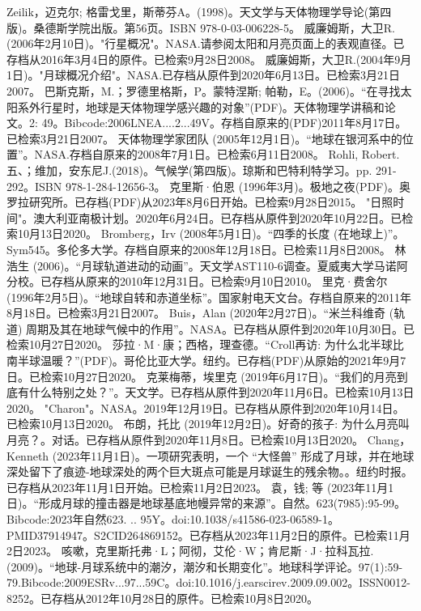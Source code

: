 \begin{enumerate}
 Zeilik，迈克尔; 格雷戈里，斯蒂芬A。(1998)。天文学与天体物理学导论(第四版)。桑德斯学院出版。第56页。ISBN 978-0-03-006228-5。
 威廉姆斯，大卫R.(2006年2月10日)。"行星概况"。NASA.请参阅太阳和月亮页面上的表观直径。已存档从2016年3月4日的原件。已检索9月28日2008。
 威廉姆斯，大卫R.(2004年9月1日)。"月球概况介绍"。NASA.已存档从原件到2020年6月13日。已检索3月21日2007。
 巴斯克斯，M.；罗德里格斯，P。蒙特涅斯; 帕勒，E。(2006)。“在寻找太阳系外行星时，地球是天体物理学感兴趣的对象”(PDF)。天体物理学讲稿和论文。2: 49。Bibcode:2006LNEA....2...49V。存档自原来的(PDF)2011年8月17日。已检索3月21日2007。
 天体物理学家团队 (2005年12月1日)。“地球在银河系中的位置”。NASA.存档自原来的2008年7月1日。已检索6月11日2008。
 Rohli, Robert.五、；维加，安东尼J.(2018)。气候学(第四版)。琼斯和巴特利特学习。pp. 291-292。ISBN 978-1-284-12656-3。
 克里斯·伯恩 (1996年3月)。极地之夜(PDF)。奥罗拉研究所。已存档(PDF)从2023年8月6日开始。已检索9月28日2015。
 "日照时间"。澳大利亚南极计划。2020年6月24日。已存档从原件到2020年10月22日。已检索10月13日2020。
 Bromberg，Irv (2008年5月1日)。“四季的长度 (在地球上)”。Sym545。多伦多大学。存档自原来的2008年12月18日。已检索11月8日2008。
 林浩生 (2006)。“月球轨道进动的动画”。天文学AST110-6调查。夏威夷大学马诺阿分校。已存档从原来的2010年12月31日。已检索9月10日2010。
 里克·费舍尔 (1996年2月5日)。“地球自转和赤道坐标”。国家射电天文台。存档自原来的2011年8月18日。已检索3月21日2007。
 Buis，Alan (2020年2月27日)。“米兰科维奇 (轨道) 周期及其在地球气候中的作用”。NASA。已存档从原件到2020年10月30日。已检索10月27日2020。
 莎拉·M·康；西格，理查德。“Croll再访: 为什么北半球比南半球温暖？”(PDF)。哥伦比亚大学。纽约。已存档(PDF)从原始的2021年9月7日。已检索10月27日2020。
 克莱梅蒂，埃里克 (2019年6月17日)。“我们的月亮到底有什么特别之处？”。天文学。已存档从原件到2020年11月6日。已检索10月13日2020。
 "Charon"。NASA。2019年12月19日。已存档从原件到2020年10月14日。已检索10月13日2020。
 布朗，托比 (2019年12月2日)。好奇的孩子: 为什么月亮叫月亮？。对话。已存档从原件到2020年11月8日。已检索10月13日2020。
 Chang，Kenneth (2023年11月1日)。一项研究表明，一个 “大怪兽” 形成了月球，并在地球深处留下了痕迹-地球深处的两个巨大斑点可能是月球诞生的残余物。。纽约时报。已存档从2023年11月1日开始。已检索11月2日2023。
 袁，钱; 等 (2023年11月1日)。“形成月球的撞击器是地球基底地幔异常的来源”。自然。623(7985):95-99。Bibcode:2023年自然623. .. 95Y。doi:10.1038/s41586-023-06589-1。PMID37914947。S2CID264869152。已存档从2023年11月2日的原件。已检索11月2日2023。  
 咳嗽，克里斯托弗·L；阿彻，艾伦·W；肯尼斯·J·拉科瓦拉.(2009)。“地球-月球系统中的潮汐，潮汐和长期变化”。地球科学评论。97(1):59-79.Bibcode:2009ESRv...97...59C。doi:10.1016/j.earscirev.2009.09.002。ISSN0012-8252。已存档从2012年10月28日的原件。已检索10月8日2020。 

\end{enumerate}

